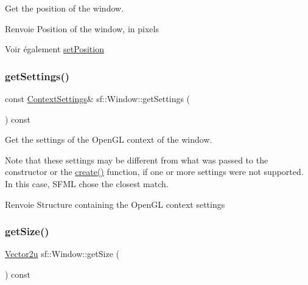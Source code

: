 Get the position of the window. 

\begin{DoxyReturn}{Renvoie}
Position of the window, in pixels
\end{DoxyReturn}
\begin{DoxySeeAlso}{Voir également}
\hyperlink{classsf_1_1Window_a6c4078bfbf61c29bfc4b4732ce764f17}{set\+Position} 
\end{DoxySeeAlso}
\mbox{\label{classsf_1_1Window_ae5b8065e92bbd0408e1fd8328e80d7d1}} 
\subsubsection{\texorpdfstring{get\+Settings()}{getSettings()}}
{\footnotesize\ttfamily const \hyperlink{structsf_1_1ContextSettings}{Context\+Settings}\& sf\+::\+Window\+::get\+Settings (\begin{DoxyParamCaption}{ }\end{DoxyParamCaption}) const}



Get the settings of the Open\+GL context of the window. 

Note that these settings may be different from what was passed to the constructor or the \hyperlink{classsf_1_1Window_a30e6edf2162f8dbff61023b9de5d961d}{create()} function, if one or more settings were not supported. In this case, S\+F\+ML chose the closest match.

\begin{DoxyReturn}{Renvoie}
Structure containing the Open\+GL context settings 
\end{DoxyReturn}
\mbox{\label{classsf_1_1Window_a3969926741cbe83d7f9eeaf5333d4e71}} 
\subsubsection{\texorpdfstring{get\+Size()}{getSize()}}
{\footnotesize\ttfamily \hyperlink{classsf_1_1Vector2}{Vector2u} sf\+::\+Window\+::get\+Size (\begin{DoxyParamCaption}{ }\end{DoxyParamCaption}) const}



